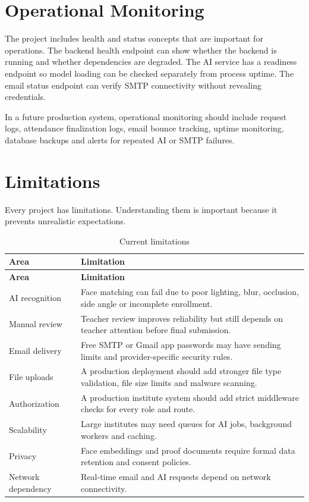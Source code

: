 \section{Operational Monitoring}

The project includes health and status concepts that are important for operations. The backend health endpoint can show whether the backend is running and whether dependencies are degraded. The AI service has a readiness endpoint so model loading can be checked separately from process uptime. The email status endpoint can verify SMTP connectivity without revealing credentials.

In a future production system, operational monitoring should include request logs, attendance finalization logs, email bounce tracking, uptime monitoring, database backups and alerts for repeated AI or SMTP failures.

\section{Limitations}

Every project has limitations. Understanding them is important because it prevents unrealistic expectations.

\begin{longtable}{p{3.6cm} p{9.5cm}}
\caption{Current limitations}
\label{tab:limitations}\\
\toprule
\textbf{Area} & \textbf{Limitation}\\
\midrule
\endfirsthead
\toprule
\textbf{Area} & \textbf{Limitation}\\
\midrule
\endhead
AI recognition & Face matching can fail due to poor lighting, blur, occlusion, side angle or incomplete enrollment.\\
Manual review & Teacher review improves reliability but still depends on teacher attention before final submission.\\
Email delivery & Free SMTP or Gmail app passwords may have sending limits and provider-specific security rules.\\
File uploads & A production deployment should add stronger file type validation, file size limits and malware scanning.\\
Authorization & A production institute system should add strict middleware checks for every role and route.\\
Scalability & Large institutes may need queues for AI jobs, background workers and caching.\\
Privacy & Face embeddings and proof documents require formal data retention and consent policies.\\
Network dependency & Real-time email and AI requests depend on network connectivity.\\
\bottomrule
\end{longtable}

